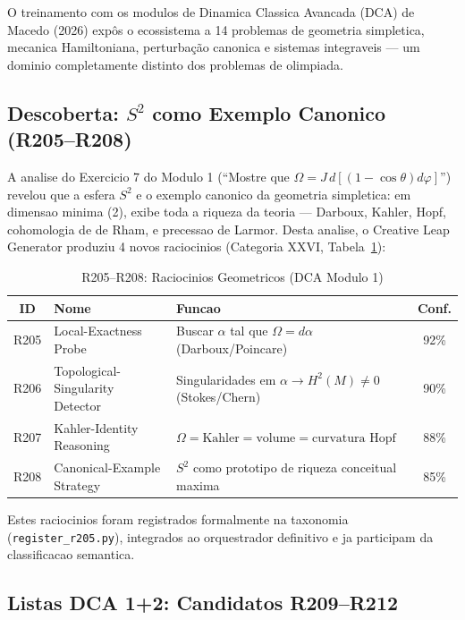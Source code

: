 \documentclass[5p]{elsarticle}
\newcommand{\tabfootnotesize}{\fontsize{9}{11}\selectfont}
\begin{document}
O treinamento com os modulos de Dinamica Classica Avancada (DCA) de Macedo (2026)
\cite{macedo2026dca} expôs o ecossistema a 14 problemas de geometria simpletica,
mecanica Hamiltoniana, perturbação canonica e sistemas integraveis --- um dominio
completamente distinto dos problemas de olimpiada.

\subsection{Descoberta: $S^2$ como Exemplo Canonico (R205--R208)}

A analise do Exercicio 7 do Modulo 1 (``Mostre que $\Omega = J\,d[(1-\cos\theta)d\varphi]$'')
revelou que a esfera $S^2$ e o exemplo canonico da geometria simpletica: em dimensao
minima (2), exibe toda a riqueza da teoria --- Darboux, Kahler, Hopf, cohomologia de
de Rham, e precessao de Larmor. Desta analise, o Creative Leap Generator produziu 4
novos raciocinios (Categoria XXVI, Tabela~\ref{tab:r205}):

\begin{table}[H]
\centering
\caption{R205--R208: Raciocinios Geometricos (DCA Modulo 1)}
\label{tab:r205}
\tabfootnotesize
\begin{tabular}{c p{3.5cm} p{5cm} c}
\toprule
\textbf{ID} & \textbf{Nome} & \textbf{Funcao} & \textbf{Conf.}\\
\midrule
R205 & Local-Exactness Probe & Buscar $\alpha$ tal que $\Omega = d\alpha$ (Darboux/Poincare) & 92\%\\
R206 & Topological-Singularity Detector & Singularidades em $\alpha \to H^2(M) \neq 0$ (Stokes/Chern) & 90\%\\
R207 & Kahler-Identity Reasoning & $\Omega = \text{Kahler} = \text{volume} = \text{curvatura Hopf}$ & 88\%\\
R208 & Canonical-Example Strategy & $S^2$ como prototipo de riqueza conceitual maxima & 85\%\\
\bottomrule
\end{tabular}
\end{table}

Estes raciocinios foram registrados formalmente na taxonomia (\texttt{register\_r205.py}),
integrados ao orquestrador definitivo e ja participam da classificacao semantica.

\subsection{Listas DCA 1+2: Candidatos R209--R212}
\end{document}
